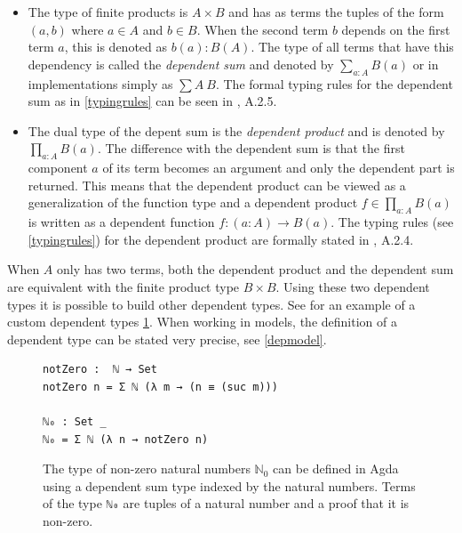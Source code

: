 \documentclass[11pt,a4paper,twoside,xetex,draft]{book}
\newcommand{\keyword}[1]{\emph{#1}\index{#1}}
\begin{document}
\begin{itemize}
\item The type of finite products is $A \times B$ and has as terms the tuples of the form $(a,b)$ where $a\in A$ and $b\in B$. When the second term $b$ depends on the first term  $a$, this is denoted as $b(a):B(A)$. The type of all terms that have this dependency is called the \keyword{dependent sum} and denoted by $\sum_{a:A} B(a)$ or in implementations simply as $\sum A \ B$. The formal typing rules for the dependent sum as in \cref{typingrules}  can be seen in \cite{Voevodsky2013}, A.2.5. %

\item The dual type of the depent sum is the \keyword{dependent product} and is denoted by $\prod_{a:A}B(a)$. The difference with the dependent sum is that the first component $a$ of its term becomes an argument and only the dependent part is returned. This means that the dependent product can be viewed as a generalization of the function type and a dependent product $f \in \prod_{a:A}B(a)$ is written as a dependent function $f: (a:A) \rightarrow B(a)$. The typing rules (see \cref{typingrules}) for the dependent product are formally stated in \cite{Voevodsky2013}, A.2.4. 
\end{itemize}




When $A$ only has two terms, both the dependent product and the dependent sum are equivalent with the finite product type $B \times B$. Using these two dependent types it is possible to build other dependent types. See for an example of a custom dependent types \cref{non-zeroNats}. When working in models, the definition of a dependent type can be stated very precise, see \cref{depmodel}.

\begin{figure}\label{non-zeroNats}
\centering
\begin{BVerbatim}
notZero :  ℕ → Set
notZero n = Σ ℕ (λ m → (n ≡ (suc m)))

ℕ₀ : Set _
ℕ₀ = Σ ℕ (λ n → notZero n)
\end{BVerbatim}
\caption{The type of non-zero natural numbers $\mathbb{N}_0$ can be defined in Agda using a dependent sum type indexed by the natural numbers. Terms of the type \texttt{ℕ₀} are tuples of a natural number and a proof that it is non-zero.}
\end{figure}
\end{document}
